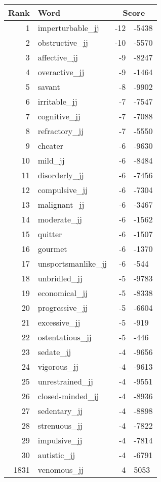 \begin{longtable}[!htbp]{| rlr@{.}l |}
    \hline
    \textbf{Rank} & \textbf{Word} & \multicolumn{2}{c|}{\textbf{Score}} \\
    \hline
    \endhead
    1 & imperturbable\_jj & -12 & -5438 \\
    2 & obstructive\_jj & -10 & -5570 \\
    3 & affective\_jj & -9 & -8247 \\
    4 & overactive\_jj & -9 & -1464 \\
    5 & savant & -8 & -9902 \\
    6 & irritable\_jj & -7 & -7547 \\
    7 & cognitive\_jj & -7 & -7088 \\
    8 & refractory\_jj & -7 & -5550 \\
    9 & cheater & -6 & -9630 \\
    10 & mild\_jj & -6 & -8484 \\
    11 & disorderly\_jj & -6 & -7456 \\
    12 & compulsive\_jj & -6 & -7304 \\
    13 & malignant\_jj & -6 & -3467 \\
    14 & moderate\_jj & -6 & -1562 \\
    15 & quitter & -6 & -1507 \\
    16 & gourmet & -6 & -1370 \\
    17 & unsportsmanlike\_jj & -6 & -544 \\
    18 & unbridled\_jj & -5 & -9783 \\
    19 & economical\_jj & -5 & -8338 \\
    20 & progressive\_jj & -5 & -6604 \\
    21 & excessive\_jj & -5 & -919 \\
    22 & ostentatious\_jj & -5 & -446 \\
    23 & sedate\_jj & -4 & -9656 \\
    24 & vigorous\_jj & -4 & -9613 \\
    25 & unrestrained\_jj & -4 & -9551 \\
    26 & closed-minded\_jj & -4 & -8936 \\
    27 & sedentary\_jj & -4 & -8898 \\
    28 & strenuous\_jj & -4 & -7822 \\
    29 & impulsive\_jj & -4 & -7814 \\
    30 & autistic\_jj & -4 & -6791 \\
    1831 & venomous\_jj & 4 & 5053 \\

\end{longtable}
